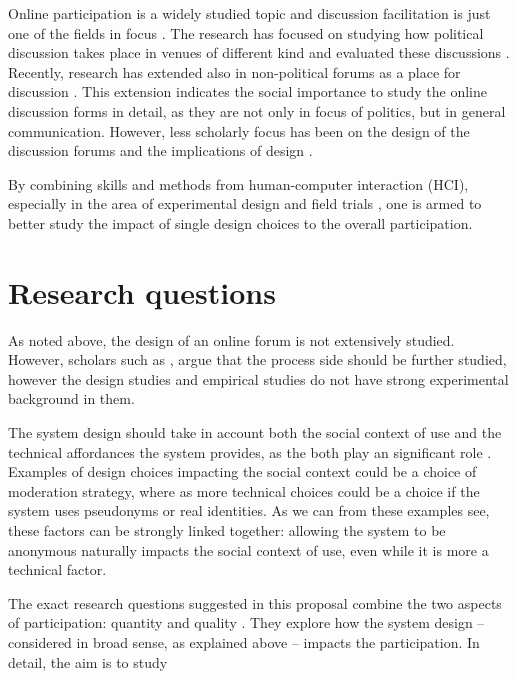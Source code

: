 \documentclass[journal,a4paper]{IEEEtran}
\begin{document}
Online participation is a widely studied topic and discussion facilitation is just one of the fields in focus . The research has focused on studying how political discussion takes place in venues of different kind  and evaluated these discussions . Recently, research has extended also in non-political forums as a place for discussion \cite{graham12}. This extension indicates the social importance to study the online discussion forms in detail, as they are not only in focus of politics, but in general communication. However, less scholarly focus has been on the design of the discussion forums and the implications of design .

By combining skills and methods from human-computer interaction (HCI), especially in the area of experimental design and field trials , one is armed to better study the impact of single design choices to the overall participation.

\section{Research questions}

As noted above, the design of an online forum is not extensively studied. However, scholars such as , argue that the process side should be further studied, however the design studies and empirical studies do not have strong experimental background in them.

The system design should take in account both the social context of use and the technical affordances the system provides, as the both play an significant role . Examples of design choices impacting the social context could be a choice of moderation strategy, where as more technical choices could be a choice if the system uses pseudonyms or real identities. As we can from these examples see, these factors can be strongly linked together: allowing the system to be anonymous naturally impacts the social context of use, even while it is more a technical factor.

The exact research questions suggested in this proposal combine the two aspects of participation: quantity and quality . They explore how the system design -- considered in broad sense, as explained above -- impacts the participation. In detail, the aim is to study
\end{document}
